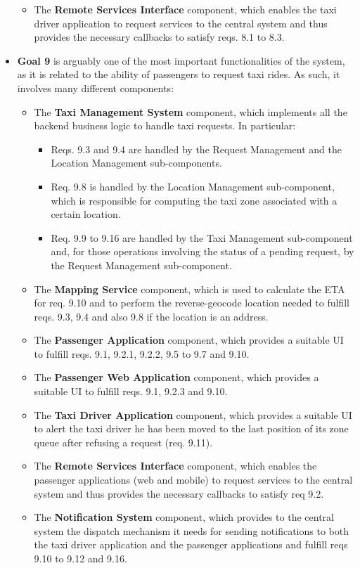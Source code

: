 \begin{itemize}
\begin{itemize}
	\item The \textbf{Remote Services Interface} component, which enables the taxi driver application to request services to the central system and thus provides the necessary callbacks to satisfy reqs. 8.1 to 8.3.
	\end{itemize}
	\item \textbf{Goal 9} is arguably one of the most important functionalities of the system, as it is related to the ability of passengers to request taxi rides. As such, it involves many different components:
	\begin{itemize}
		\item The \textbf{Taxi Management System} component, which implements all the backend business logic to handle taxi requests. In particular:
		\begin{itemize}
		\item Reqs. 9.3 and 9.4 are handled by the Request Management and the Location Management sub-components.
		\item Req. 9.8 is handled by the Location Management sub-component, which is responsible for computing the taxi zone associated with a certain location.
		\item Req. 9.9 to 9.16 are handled by the Taxi Management sub-component and, for those operations involving the status of a pending request, by the Request Management sub-component.
		\end{itemize}
		\item The \textbf{Mapping Service} component, which is used to calculate the ETA for req. 9.10 and to perform the reverse-geocode location needed to fulfill reqs. 9.3, 9.4 and also 9.8 if the location is an address.
		\item The \textbf{Passenger Application} component, which provides a suitable UI to fulfill reqs. 9.1, 9.2.1, 9.2.2, 9.5 to 9.7 and 9.10.
		\item The \textbf{Passenger Web Application} component, which provides a suitable UI to fulfill reqs. 9.1, 9.2.3 and 9.10.
		\item The \textbf{Taxi Driver Application} component, which provides a suitable UI to alert the taxi driver he has been moved to the last position of its zone queue after refusing a request (req. 9.11).
		\item The \textbf{Remote Services Interface} component, which enables the passenger applications (web and mobile) to request services to the central system and thus provides the necessary callbacks to satisfy req 9.2.
		\item The \textbf{Notification System} component, which provides to the central system the dispatch mechanism it needs for sending notifications to both the taxi driver application and the passenger applications and fulfill reqs 9.10 to 9.12 and 9.16.

\end{itemize}
\end{itemize}
